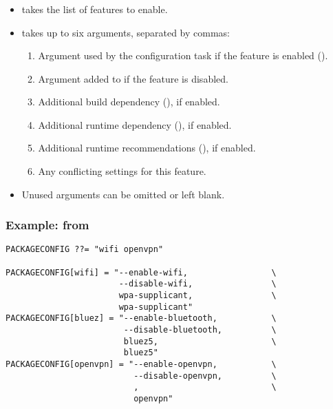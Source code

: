 \begin{frame}
  \frametitle{}
  \begin{itemize}
    \item {} takes the list of features to enable.
    \item {} takes up to six arguments,
      separated by commas:
      \begin{enumerate}
        \item Argument used by the configuration task if the feature
          is enabled ().
        \item Argument added to  if the feature is
          disabled.
        \item Additional build dependency (), if enabled.
        \item Additional runtime dependency (), if enabled.
        \item Additional runtime recommendations (), if enabled.
	\item Any conflicting  settings for this feature.
      \end{enumerate}
    \item Unused arguments can be omitted or left blank.
  \end{itemize}
\end{frame}

\begin{frame}[fragile]
  \frametitle{Example: from }
  \begin{block}{}
  \begin{verbatim}
PACKAGECONFIG ??= "wifi openvpn"

PACKAGECONFIG[wifi] = "--enable-wifi,                 \
                       --disable-wifi,                \
                       wpa-supplicant,                \
                       wpa-supplicant"
PACKAGECONFIG[bluez] = "--enable-bluetooth,           \
                        --disable-bluetooth,          \
                        bluez5,                       \
                        bluez5"
PACKAGECONFIG[openvpn] = "--enable-openvpn,           \
                          --disable-openvpn,          \
                          ,                           \
                          openvpn"
  \end{verbatim}
  \end{block}
\end{frame}

